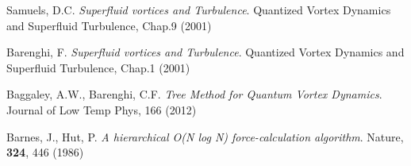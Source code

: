 \begin{thebibliography}{99}
	{\sc Samuels, D.C.}
	\emph{Superfluid vortices and Turbulence}. Quantized Vortex Dynamics and Superfluid Turbulence, Chap.9 (2001)





	{\sc Barenghi, F.}
	\emph{Superfluid vortices and Turbulence}. Quantized Vortex Dynamics and Superfluid Turbulence, Chap.1 (2001)

	{\sc Baggaley, A.W., Barenghi, C.F.}
	\emph{Tree Method for Quantum Vortex Dynamics}. Journal of Low Temp Phys, 166 (2012)

	{\sc Barnes, J., Hut, P.}
	\emph{A hierarchical O(N log N) force-calculation algorithm}. Nature, \textbf{324}, 446 (1986)



\end{thebibliography}

